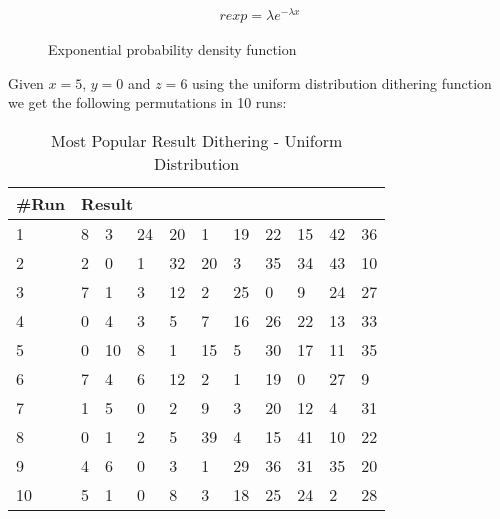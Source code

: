 \begin{figure}[H]
\label{fig:expdist}
  \centering
  \noindent\begin{minipage}{.45\textwidth}
    \end{minipage}
    \begin{minipage}{.45\textwidth}
      \begin{align}
        \label{exponential propability density function}
        rexp = \lambda e^{-\lambda x}
      \end{align}
      \end{minipage}
    \caption{Exponential probability density function}
\end{figure}


Given $x=5$, $y=0$ and $z=6$ using the uniform distribution dithering function we get the following
permutations in 10 runs:


\begin{table}[H]
	\centering
	\begin{tabular}{*{11}l}
	\toprule
	\multicolumn{1}{l}{\#Run} & \multicolumn{10}{l}{Result} \\ \midrule
	1 	& 8 & 3 &  24 &  20 &  1 &  19 &  22 &  15 &  42 &  36 \\
	2 	& 2 &  0 &  1 &  32 &  20 &  3 &  35 &  34 &  43 &  10 \\
	3	& 7 &  1 &  3 &  12 &  2 &  25 &  0 &  9 &  24 &  27\\
	4	& 0 &  4 &  3 &  5 &  7 &  16 &  26 &  22 &  13 &  33\\
	5	& 0 &  10 &  8 &  1 &  15 &  5 &  30 &  17 &  11 &  35\\
	6	& 7 &  4 &  6 &  12 &  2 &  1 &  19 &  0 &  27 &  9\\
	7	& 1 &  5 &  0 &  2 &  9 &  3 &  20 &  12 &  4 &  31\\
	8	& 0 &  1 &  2 &  5 &  39 &  4 &  15 &  41 &  10 &  22\\
	9	& 4 &  6 &  0 &  3 &  1 &  29 &  36 &  31 &  35 &  20\\
	10	& 5 &  1 &  0 &  8 &  3 &  18 &  25 & 24 & 2 & 28\\
	\bottomrule
\end{tabular}
\caption{Most Popular Result Dithering - Uniform Distribution}
\end{table}

